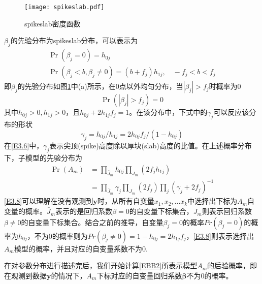 \documentclass[12pt]{article} %
\begin{document}
	\begin{figure}[ht]
		
		\centering
		\texttt{[image: spikeslab.pdf]}
		\caption{spikeslab密度函数}
		\label{spikeslab}
	\end{figure}
	
	$\beta_j$的先验分布为spikeslab分布，可以表示为
	\begin{equation}
		\begin{gathered}
			\operatorname{Pr}\left(\beta_{j}=0\right)=h_{0 j} \\ \label{E3.4}
			\operatorname{Pr}\left(\beta_{j}<b, \beta_{j} \neq 0\right)=\left(b+f_{j}\right) h_{1 j}, \quad-f_{j}<b<f_{j}
		\end{gathered}
	\end{equation}
	即$\beta_j$的先验分布如图\ref{spikeslab}中(a)所示，在0点以外均匀分布，当$|\beta_j |>f_j$时概率为0
	\begin{equation}
		\operatorname{Pr}\left(\left|\beta_{j}\right|>f_{j}\right)=0
	\end{equation}
	其中$h_{0j}>0, h_{1j}>0$，且$h_{0j}+2h_{1j}f_j=1$。在该分布中，下式中的$\gamma_j$可以反应该分布的形状
	\begin{equation}
		\gamma_{j}=h_{0 j} / h_{1 j}=2 h_{0 j} f_{j} /\left(1-h_{0 j}\right) \label{E3.6}
	\end{equation}
	在\eqref{E3.6}中，$\gamma_j$表示尖顶(spike)高度除以厚块(slab)高度的比值。在上述概率分布下，子模型的先验分布为
	\begin{equation}
		\begin{aligned}
			\operatorname{Pr}\left(A_{m}\right) &=\prod_{\bar{J}_{m}} h_{0 j} \prod_{J_{m}}\left(2 f_{j} h_{1 j}\right) \\
			&=\prod_{\bar{J}_{m}} \gamma_{j} \prod_{J_{m}}\left(2 f_{j}\right) \prod_{j}\left(\gamma_{j}+2 f_{j}\right)^{-1} \label{E3.8}
		\end{aligned}
	\end{equation}
	\eqref{E3.8}可以理解在没有观测到$\mathbf{y}$时，从所有自变量$x_1,x_2,...x_k$中选择出下标为$A_m$自变量的概率。$\bar{J}_m$表示的是回归系数$\beta=0$的自变量下标集合，$J_m$则表示回归系数$\beta\neq 0$的自变量下标集合。结合之前的推导，自变量$\beta_j=0$的概率$Pr(\beta_j=0)$的概率为$h_{0j}$，不为0的概率则为$Pr(\beta_j \neq 0)=1-h_{0j}=2h_{1j}f_j$，\eqref{E3.8}则表示选择出$A_m$模型的概率，并且对应的自变量系数不为0.
	
	在对参数分布进行描述完后，我们开始计算\eqref{EBB2}所表示模型$A_m$的后验概率，即在观测到数据$\mathbf{y}$的情况下，$A_m$下标对应的自变量回归系数$\boldsymbol{\beta}$不为0的概率。
	
\end{document}
